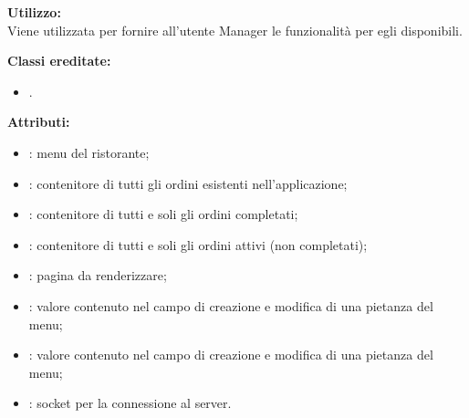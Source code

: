 \textbf{Utilizzo:}\\
Viene utilizzata per fornire all'utente Manager le funzionalità per egli disponibili.

\textbf{Classi ereditate:}
\begin{itemize}
	\item {}.
\end{itemize}
%

\textbf{Attributi:}
\begin{itemize}
	\item {}: menu del ristorante;
	\item {}: contenitore di tutti gli ordini esistenti nell'applicazione;
	\item {}: contenitore di tutti e soli gli ordini completati;
	\item {}: contenitore di tutti e soli gli ordini attivi (non completati);
	\item {}: pagina da renderizzare;
	\item {}: valore contenuto nel campo  di creazione e modifica di una pietanza del menu;
	\item {}: valore contenuto nel campo  di creazione e modifica di una pietanza del menu;
	\item {}: socket per la connessione al server.
\end{itemize}

